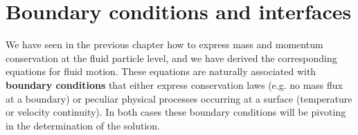 \chapter{Boundary conditions and interfaces}
\label{chap:boundary_conditions}
We have seen in the previous chapter how to express mass and momentum conservation at the fluid particle level, and we have derived the corresponding equations for fluid motion. These equations are naturally associated with \textbf{boundary conditions} that either express conservation laws (e.g. no mass flux at a boundary) or peculiar physical processes occurring at a surface (temperature or velocity continuity). In both cases these boundary conditions will be pivoting in the determination of the solution.
%
